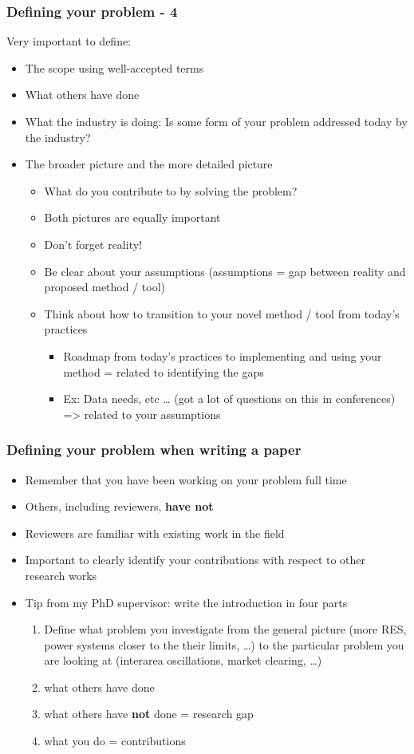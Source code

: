 \documentclass[screen, aspectratio=43]{beamer}
\begin{document}
\begin{frame}
\frametitle{Defining your problem - 4}
Very important to define:
\begin{itemize}
\item The scope using well-accepted terms
\item What others have done
\item What the industry is doing: Is some form of your problem addressed today by the industry?
\item The broader picture and the more detailed picture
  \begin{itemize}
  \item What do you contribute to by solving the problem?
  \item Both pictures are equally important
  \item Don’t forget reality!
  \item Be clear about your assumptions (assumptions = gap between reality and proposed method / tool)
  \item Think about how to transition to your novel method / tool from today’s practices
    \begin{itemize}
    \item Roadmap from today’s practices to implementing and using your method = related to identifying the gaps
    \item Ex: Data needs, etc … (got a lot of questions on this in conferences) => related to your assumptions
    \end{itemize}
  \end{itemize}
\end{itemize}    
\end{frame}

\begin{frame}
  \frametitle{Defining your problem when writing a paper}
  \begin{itemize}
  \item Remember that you have been working on your problem full time
  \item Others, including reviewers, \textbf{have not}
  \item Reviewers are familiar with existing work in the field
  \item Important to clearly identify your contributions with respect to other research works
  \item Tip from my PhD supervisor: write the introduction in four parts
    \begin{enumerate}
    \item Define what problem you investigate from the general picture (more RES, power systems closer to the their limits, …) to the particular problem you are looking at (interarea oscillations, market clearing, …)
    \item what others have done
    \item what others have \textbf{not} done = research gap
    \item what you do = contributions
    \end{enumerate}
  \end{itemize}
\end{frame}
\end{document}
